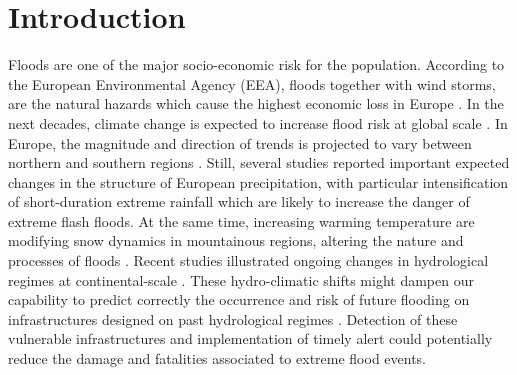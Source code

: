 \chapter{Introduction}
\label{chp:introduction}

\newcommand{\keyword}[1]{\textbf{#1}}
\newcommand{\tabhead}[1]{\textbf{#1}}
\newcommand{\code}[1]{\texttt{#1}}
\newcommand{\file}[1]{\texttt{\bfseries#1}}
\newcommand{\option}[1]{\texttt{\itshape#1}}

Floods are one of the major socio-economic risk for the population. According to the European Environmental Agency (EEA), floods together with wind storms, are the natural hazards which cause the highest economic loss  
in Europe \autocite{european_environment_agency_flood_2013}.
In the next decades, climate change is expected to increase flood risk at global scale \autocite{milly_increasing_2002,hirabayashi_global_2008,hirabayashi_global_2013}. In Europe, the magnitude and direction of trends is projected to vary between northern and southern regions \autocite{dankers_flood_2009,alfieri_global_2015, thober_multi-model_2018}. Still, several studies reported important expected changes in the structure of European precipitation, with particular intensification of short-duration extreme rainfall \autocite{christensen_intensification_2004,zolina_changing_2010,westra_global_2013} which are likely to increase the danger of extreme flash floods. 
At the same time, increasing warming temperature are modifying snow dynamics in mountainous regions, altering the nature and processes of floods \autocite{koplin_seasonality_2014,hall_understanding_2014}. 
Recent studies illustrated ongoing changes in hydrological regimes at continental-scale \autocite{bloschl_changing_2017}.
These hydro-climatic shifts might dampen our capability to predict correctly the occurrence and risk of future flooding on infrastructures designed on past hydrological regimes \autocite{milly_increasing_2002}.
Detection of these vulnerable infrastructures and implementation of timely alert could potentially reduce the damage and fatalities associated to extreme flood events.\\
 
